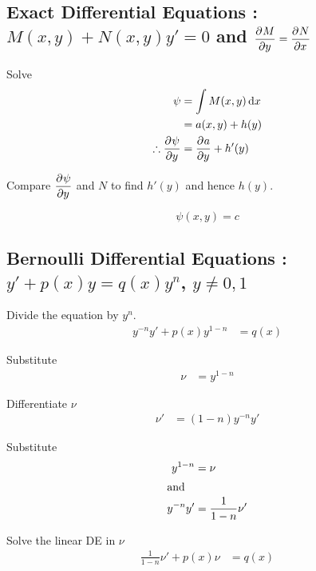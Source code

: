 \documentclass[fleqn, a4paper, 12pt, twoside]{article}
\theoremstyle{definition}
\theoremstyle{theorem}
\begin{document}
\subsection{Exact Differential Equations : $M(x,y) + N(x,y) y' = 0$ and $\dpd{M}{y} = \dpd{N}{x}$}

\begin{algorithmic}[1]
	\item 
		Solve
		\begin{align*}
			\psi &= \int M(x,y) \dif x\\
			&= a(x,y) + h(y)\\
			\therefore \dpd{\psi}{y} &= \dpd{a}{y} + h'(y)
		\end{align*}
	\item 
		Compare $\dpd{\psi}{y}$ and $N$ to find $h'(y)$ and hence $h(y)$.
	\item 
		\begin{equation*}
			\psi(x,y) = c
		\end{equation*}
\end{algorithmic}

\subsection{Bernoulli Differential Equations : $y' + p(x) y = q(x) y^n$, $y \neq 0,1$}

\begin{algorithmic}[1]
	\item
		Divide the equation by $y^{n}$.
		\begin{align*}
			y^{-n} y' + p(x) y^{1 - n} &= q(x)
		\end{align*}
	\item 
		Substitute 
		\begin{align*}
			\nu &= y^{1 - n}
		\end{align*}
	\item 
		Differentiate $\nu$
		\begin{align*}
			\nu' &= (1 - n) y^{-n} y'
		\end{align*}
	\item 
		Substitute
		\begin{align*}
			y^{1 - n} &= \nu\\
			\intertext{and}
			y^{-n} y' &= \frac{1}{1 - n} \nu'
		\end{align*}
	\item 
		Solve the linear DE in $\nu$
		\begin{align*}
			\frac{1}{1 - n} \nu' + p(x) \nu &= q(x)
		\end{align*}
\end{algorithmic}
\end{document}

